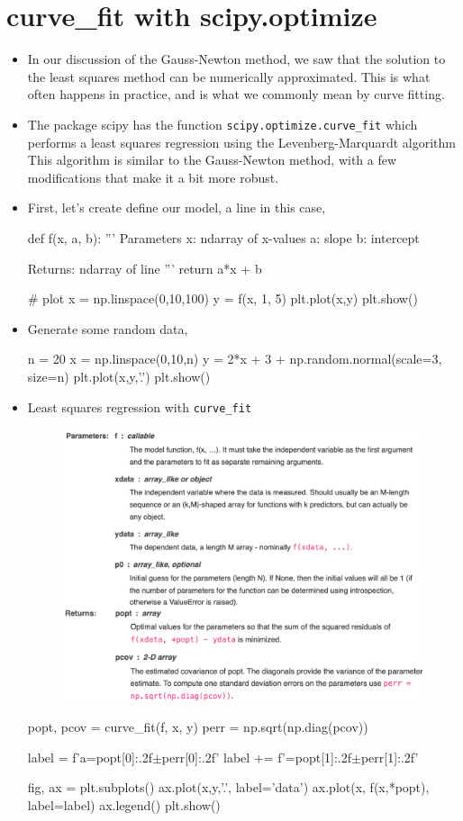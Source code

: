 \documentclass[12pt]{article}
\numberwithin{equation}{section}
\begin{document}
\section{curve\_fit with scipy.optimize}
\begin{itemize}
\item In our discussion of the Gauss-Newton method, we saw that the solution to the least squares method can be numerically approximated. This is what often happens in practice, and is what we commonly mean by curve fitting.
\item The package scipy has the function \verb|scipy.optimize.curve_fit| which performs a least squares regression using the Levenberg-Marquardt algorithm This algorithm is similar to the Gauss-Newton method, with a few modifications that make it a bit more robust.
\item First, let's create define our model, a line in this case,
\begin{python}
def f(x, a, b):
	'''
	Parameters
		x: ndarray of x-values
		a: slope
		b: intercept
	
	Returns: ndarray of line
	'''
	return a*x + b
	
# plot
x = np.linspace(0,10,100)
y = f(x, 1, 5)
plt.plot(x,y)
plt.show()
\end{python}
\item Generate some random data,
\begin{python}
n = 20
x = np.linspace(0,10,n)
y = 2*x + 3 + np.random.normal(scale=3, size=n)
plt.plot(x,y,'.')
plt.show()
\end{python}

\item Least squares regression with \verb|curve_fit|
\begin{figure}[H]
	\centering
	\includegraphics[width=12cm] {cf}
\end{figure}
\begin{python}
popt, pcov = curve_fit(f, x, y)
perr = np.sqrt(np.diag(pcov))

label = f'a={popt[0]:.2f}$\pm${perr[0]:.2f}'
label += f'\nb={popt[1]:.2f}$\pm${perr[1]:.2f}'

fig, ax = plt.subplots()
ax.plot(x,y,'.', label='data')
ax.plot(x, f(x,*popt), label=label)
ax.legend()
plt.show()
\end{python}

\end{itemize}
\end{document}

